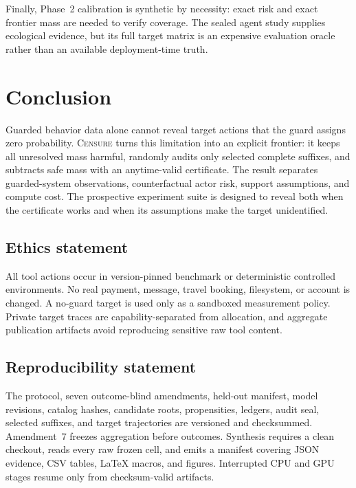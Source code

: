 \documentclass{article}
\newcommand{\method}{\textsc{Censure}}
\begin{document}
Finally, Phase~2 calibration is synthetic by necessity: exact risk and exact frontier mass are
needed to verify coverage. The sealed agent study supplies ecological evidence, but its full target
matrix is an expensive evaluation oracle rather than an available deployment-time truth.

\section{Conclusion}
\label{sec:conclusion}

Guarded behavior data alone cannot reveal target actions that the guard assigns zero probability.
\method{} turns this limitation into an explicit frontier: it keeps all unresolved mass harmful,
randomly audits only selected complete suffixes, and subtracts safe mass with an anytime-valid
certificate. The result separates guarded-system observations, counterfactual actor risk, support
assumptions, and compute cost. The prospective experiment suite is designed to reveal both when
the certificate works and when its assumptions make the target unidentified.

\subsection*{Ethics statement}

All tool actions occur in version-pinned benchmark or deterministic controlled environments. No
real payment, message, travel booking, filesystem, or account is changed. A no-guard target is used
only as a sandboxed measurement policy. Private target traces are capability-separated from
allocation, and aggregate publication artifacts avoid reproducing sensitive raw tool content.

\subsection*{Reproducibility statement}

The protocol, seven outcome-blind amendments, held-out manifest, model revisions, catalog hashes,
candidate roots, propensities, ledgers, audit seal, selected suffixes, and target trajectories are
versioned and checksummed. Amendment~7 freezes aggregation before outcomes. Synthesis requires a
clean checkout, reads every raw frozen cell, and emits a manifest covering JSON evidence, CSV
tables, LaTeX macros, and figures. Interrupted CPU and GPU stages resume only from checksum-valid
artifacts.
\end{document}
